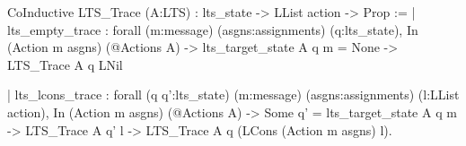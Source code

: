 CoInductive LTS_Trace (A:LTS) : lts_state -> LList action -> Prop :=
  | lts_empty_trace : 
      forall (m:message) (asgns:assignments) (q:lts_state), 
         In (Action m asgns) (@Actions A) ->
         lts_target_state A q m = None ->
         LTS_Trace A q LNil
  
  | lts_lcons_trace : forall (q q':lts_state) (m:message) 
      (asgns:assignments) (l:LList action),
         In (Action m asgns) (@Actions A) ->
         Some q' = lts_target_state A q m ->  
         LTS_Trace A q' l                -> 
         LTS_Trace A q (LCons (Action m asgns) l).